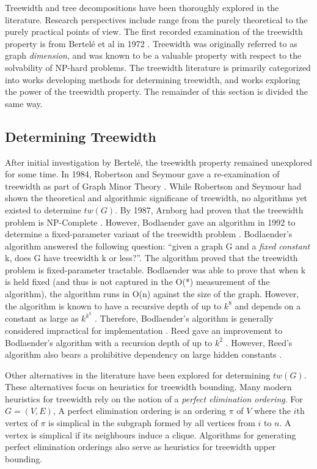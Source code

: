 \documentclass[12pt,conference]{IEEEtran}
\theoremstyle{plain}
\begin{document}
Treewidth and tree decompositions have been thoroughly explored in the literature. Research perspectives include range from the purely theoretical to the purely practical points of view. The first recorded examination of the treewidth property is from Bertel\'e et al in 1972 \cite{treewidth-original}. Treewidth was originally referred to as graph \textit{dimension}, and was known to be a valuable property with respect to the solvability of NP-hard problems. The treewidth literature is primarily categorized into works developing methods for determining treewidth, and works exploring the power of the treewidth property. The remainder of this section is divided the same way.

\subsection{Determining Treewidth}

After initial investigation by Bertelé, the treewidth property remained unexplored for some time. In 1984, Robertson and Seymour gave a re-examination of treewidth as part of Graph Minor Theory \cite{treewidth-rob-seymour}. While Robertson and Seymour had shown the theoretical and algorithmic significane of treewidth, no algorithms yet existed to determine $tw(G)$. By 1987, Arnborg had proven that the treewidth problem is NP-Complete \cite{arnborg-np-complete}. However, Bodlaender gave an algorithm in 1992 to determine a fixed-parameter variant of the treewidth problem \cite{bodlaender-1992}. Bodlaender's algorithm answered the following question: ``given a graph G and a \textit{fixed constant} k, does G have treewidth k or less?''. The algorithm proved that the treewidth problem is fixed-parameter tractable. Bodlaender was able to prove that when k is held fixed (and thus is not captured in the O(*) measurement of the algorithm), the algorithm runs in O(n) against the size of the graph. However, the algorithm is known to have a recursive depth of up to $k^{8}$ and depends on a constant as large as $k^{k^{3}}$ \cite{bodlaender-problems}. Therefore, Bodlaender's algorithm is generally considered impractical for implementation \cite{fellows-on-bodlaender}. Reed gave an improvement to Bodlaender's algorithm with a recursion depth of up to $k^{2}$ \cite{reed-tw-improvement}. However, Reed's algorithm also bears a prohibitive dependency on large hidden constants \cite{reed-tw-analysis}.

Other alternatives in the literature have been explored for determining $tw(G)$. These alternatives focus on heuristics for treewidth bounding. Many modern heuristics for treewidth rely on the notion of a \textit{perfect elimination ordering}. For $G=(V,E)$, A perfect elimination ordering is an ordering $\pi$ of $V$ where the $i$th vertex of $\pi$ is simplical in the subgraph formed by all vertices from $i$ to $n$. A vertex is simplical if its neighbours induce a clique. Algorithms for generating perfect elimination orderings also serve as heuristics for treewidth upper bounding. 
\end{document}

